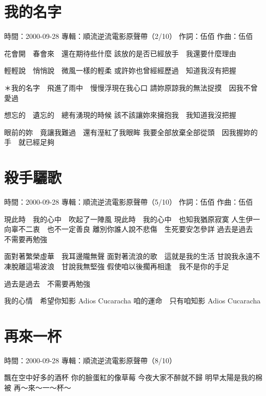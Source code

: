 \documentclass[UTF8,a4paper,oneside,twocolumn,12pt]{ctexbook}
\newcommand{\infopair}[2]{\textbullet #1：#2}
\newcommand{\zc}[1][伍佰]{\infopair{作詞}{#1}}
\newcommand{\zq}[1][伍佰]{\infopair{作曲}{#1}}
\newcommand{\zj}[1]{\infopair{專輯}{#1}}
\newcommand{\sj}[1]{\infopair{時間}{#1}}
\newenvironment{info}{\begin{flushleft}\kaishu
	}
	{\end{flushleft}\normalsize\yahei\par}
\newenvironment{lyric}{
	}
{}
\begin{document}
\section{我的名字}
\begin{info}
	\sj{2000-09-28}
	\zj{順流逆流電影原聲帶（2/10）}
	\zc
	\zq
\end{info}
\begin{lyric}
	花會開　春會來　還在期待些什麼
	該放的是否已經放手　我還要什麼理由

	輕輕說　悄悄說　微風一樣的輕柔
	或許妳也曾經經歷過　知道我沒有把握

	＊我的名字　飛進了雨中　慢慢浮現在我心口
	請妳原諒我的無法捉摸　因我不曾愛過

	想忘的　遺忘的　總有湧現的時候
	該不該讓妳來擁抱我　我知道我沒把握

	眼前的妳　竟讓我難過　還有溼紅了我眼眸
	我要全部放棄全部從頭　因我握妳的手　就已經足夠
\end{lyric}

\section{殺手驪歌}
\begin{info}
	\sj{2000-09-28}
	\zj{順流逆流電影原聲帶（5/10）}
	\zc
	\zq
\end{info}
\begin{lyric}
	現此時　我的心中　吹起了一陣風
	現此時　我的心中　也知我猶原寂寞
	人生伊一向辜不二衷　也不一定善良
	離別你誰人說不悲傷　生死要安怎參詳
	過去是過去　不需要再勉強

	面對著繁榮虛華　我耳邊隴無聲
	面對著流浪的歌　這就是我的生活
	甘說我永遠不凍脫離這場波浪　甘說我無堅強
	假使咱以後擱再相逢　我不是你的手足

	過去是過去　不需要再勉強

	我的心情　希望你知影 Adios Cucaracha
	咱的運命　只有咱知影 Adios Cucaracha
\end{lyric}

\section{再來一杯}
\begin{info}
	\sj{2000-09-28}
	\zj{順流逆流電影原聲帶（8/10）}
\end{info}
\begin{lyric}
	飄在空中好多的酒杯
	你的臉蛋紅的像草莓
	今夜大家不醉就不歸
	明早太陽是我的棉被
	再～來～一～杯～
\end{lyric}
\end{document}
